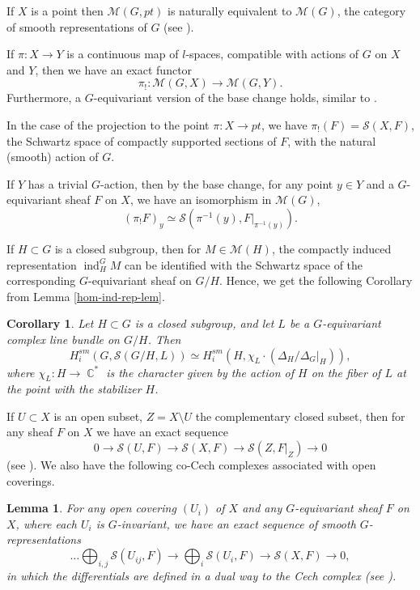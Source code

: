 \documentclass[12pt,reqno]{amsart}
\DeclareMathOperator\C{\mathbb C}
\newtheorem{lemma}[theorem]{Lemma}
\newtheorem{cor}[theorem]{Corollary}
\theoremstyle{definition}
\theoremstyle{remark}
\numberwithin{equation}{section}
\newcommand{\ind}{\operatorname{ind}}
\newcommand{\De}{\Delta}
\renewcommand{\SS}{{\mathcal S}}
\newcommand{\MM}{{\mathcal M}}
\newcommand{\sub}{\subset}
\begin{document}
If $X$ is a point then $\MM(G,pt)$ is naturally equivalent to $\MM(G)$, the category of smooth representations of $G$ (see \cite[Sec.\ 1.3]{Bern}).

If $\pi:X\to Y$ is a continuous map of $l$-spaces, compatible with actions of $G$ on $X$ and $Y$, then we have an exact functor
$$\pi_!:\MM(G,X)\to \MM(G,Y).$$
Furthermore, a $G$-equivariant version of the base change holds, similar to \cite[Sec.\ 1.3, Prop.\ 3]{Bern}.

In the case of the projection to the point $\pi:X\to pt$, we have $\pi_!(F)=\SS(X,F)$, the Schwartz  space of compactly supported sections of $F$, with the natural
(smooth) action of $G$.

If $Y$ has a trivial $G$-action, then by the base change, for any point $y\in Y$ and a $G$-equivariant sheaf $F$ on $X$, we have
an isomorphism in $\MM(G)$,
\begin{equation}\label{push-forward-stalk-eq}
(\pi_!F)_y\simeq \SS(\pi^{-1}(y), F|_{\pi^{-1}(y)}).
\end{equation}


If $H\sub G$ is a closed subgroup, then for $M\in \MM(H)$, 
the compactly induced representation $\ind_H^G M$ can be identified with the Schwartz space of
the corresponding $G$-equivariant sheaf on $G/H$. Hence, we get the following Corollary from Lemma \ref{hom-ind-rep-lem}.

\begin{cor}\label{G/H-cor}
Let $H\sub G$ is a closed subgroup, and let $L$ be a $G$-equivariant complex line bundle on $G/H$.
Then
$$H^{sm}_i(G,\SS(G/H,L))\simeq H^{sm}_i(H,\chi_L\cdot (\De_H/\De_G|_H)),$$
where $\chi_L:H\to \C^*$ is the character given by the action of $H$ on the fiber of $L$ at the point with the stabilizer $H$.
\end{cor}



If $U\sub X$ is an open subset, $Z=X\setminus U$ the complementary closed subset, then for any sheaf $F$ on $X$ we have an exact sequence
$$0\to \SS(U,F)\to \SS(X,F)\to \SS(Z,F|_Z)\to 0$$
(see \cite[Sec.\ 1.3, Prop.\ 4]{Bern}). We also have the following co-Cech complexes associated with open coverings.

\begin{lemma}\label{co-Cech-lem}
For any open covering $(U_i)$ of $X$ and any $G$-equivariant sheaf $F$ on $X$, where each $U_i$ is $G$-invariant, we have an exact sequence
of smooth $G$-representations
$$\ldots \bigoplus_{i,j} \SS(U_{ij},F)\to \bigoplus_i \SS(U_i,F)\to \SS(X,F)\to 0,$$
in which the differentials are defined in a dual way to the Cech complex (see \cite[Sec.\ 21.8]{stacks}).
\end{lemma}
\end{document}
